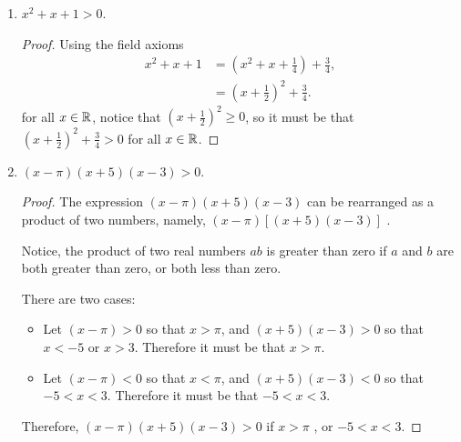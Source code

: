 \begin{exercise}[\textbf{4}]
\begin{enumerate}
\begin{proof}
\begin{align*}
                x^2-x-6 &> 0 \\
                (x-3)(x+2) &> 0
            \end{align*}
            To assure that the product is positive, it must be that
            the two numbers are both positive or both negative. Hence,
         \begin{equation*}
             x-3>0 \qquad \text{and} \qquad x+2>0
         \end{equation*}
         such that $x>3$. Or 
         \begin{equation*}
             x-3 < 0 \qquad \text{and} \qquad x+2<0
         \end{equation*}
         such that $x<-2$. Therefore, $x^2-x+10>16$ if $x>3$ or $x<-2$.
         \end{proof}
         \pagebreak
         \item $x^2+x+1 > 0$.
         \begin{proof} Using the field axioms
              \begin{align*}
                  x^2+x+1 &= (x^2+x+\frac{1}{4})+\frac{3}{4},\\
                  &= \left(x+\frac{1}{2}\right)^2 + \frac{3}{4} .
              \end{align*}
              for all $x\in \mathbb{R}$, notice that $(x+\frac{1}{2})^2 \geq 0$, so it
              must be that $(x+\frac{1}{2})^2+\frac{3}{4} >0$ for all $x\in \mathbb{R}$.
         \end{proof}
         \item $(x-\pi)(x+5)(x-3)>0$.
         \begin{proof} The expression $(x- \pi)(x+5)(x-3)$ can be rearranged as
         a product of two numbers, namely, $(x- \pi)\left[(x+5)(x-3)\right]$ .
              
         Notice, the product of two real numbers $ab$ is greater than zero if
         $a$ and $b$ are both greater than zero, or both less than zero.

         There are two cases:
         \begin{itemize}
            \item Let $(x- \pi) >0$ so that $x> \pi$, and $(x+5)(x-3)>0$ so that
            $x<-5$ or $x>3$. Therefore it must be that $x> \pi$.
            
            \item Let $(x-\pi) <0$ so that $x< \pi$, and $(x+5)(x-3)<0$ so that
            $-5<x<3$. Therefore it must be that $-5<x<3$. 
         \end{itemize}
         Therefore, $(x-\pi)(x+5)(x-3)>0$ if $x>\pi$ , or $-5<x<3$.   
         \end{proof}
         

\end{enumerate}
\end{exercise}
